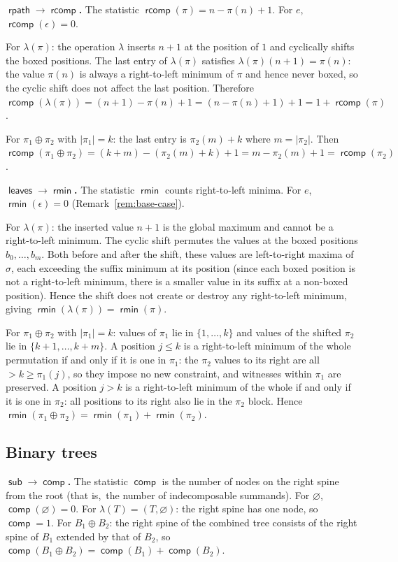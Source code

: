 \documentclass[a4paper,11pt]{article}
\theoremstyle{definition}
\DeclareMathOperator{\comp}{\mathsf{comp}}
\DeclareMathOperator{\rcomp}{\mathsf{rcomp}}
\DeclareMathOperator{\rpath}{\mathsf{rpath}}
\DeclareMathOperator{\leaves}{\mathsf{leaves}}
\DeclareMathOperator{\rmin}{\mathsf{rmin}}
\DeclareMathOperator{\subtrees}{\mathsf{sub}}
\begin{document}
\textbf{$\boldsymbol{\rpath \to \rcomp}$.}
The statistic $\rcomp(\pi) = n - \pi(n) + 1$. For $e$,
$\rcomp(\epsilon) = 0$.

For $\lambda(\pi)$: the operation $\lambda$ inserts
$n{+}1$ at the position of $1$ and cyclically shifts the
boxed positions. The last entry of $\lambda(\pi)$
satisfies $\lambda(\pi)(n{+}1) = \pi(n)$: the value
$\pi(n)$ is always a right-to-left minimum of $\pi$
and hence never boxed, so the cyclic shift does not
affect the last position. Therefore
$\rcomp(\lambda(\pi))
= (n{+}1) - \pi(n) + 1 = (n - \pi(n) + 1) + 1
= 1 + \rcomp(\pi)$.

For $\pi_1 \oplus \pi_2$ with $|\pi_1| = k$: the last
entry is $\pi_2(m) + k$ where $m = |\pi_2|$. Then
$\rcomp(\pi_1 \oplus \pi_2)
= (k{+}m) - (\pi_2(m) + k) + 1
= m - \pi_2(m) + 1 = \rcomp(\pi_2)$.

\textbf{$\boldsymbol{\leaves \to \rmin}$.}
The statistic $\rmin$ counts right-to-left minima. For
$e$, $\rmin(\epsilon) = 0$ (Remark~\ref{rem:base-case}).

For $\lambda(\pi)$: the inserted value $n{+}1$ is the
global maximum and cannot be a right-to-left minimum.
The cyclic shift permutes the values at the boxed
positions $b_0, \ldots, b_m$. Both before and after
the shift, these values are left-to-right maxima of
$\sigma$, each exceeding the suffix minimum at its
position (since each boxed position is not a
right-to-left minimum, there is a smaller value in
its suffix at a non-boxed position). Hence the shift does not create or destroy
any right-to-left minimum, giving
$\rmin(\lambda(\pi)) = \rmin(\pi)$.

For $\pi_1 \oplus \pi_2$ with $|\pi_1| = k$: values of
$\pi_1$ lie in $\{1, \ldots, k\}$ and values of the
shifted $\pi_2$ lie in $\{k{+}1, \ldots, k{+}m\}$. A
position $j \leq k$ is a right-to-left minimum of the
whole permutation if and only if it is one in $\pi_1$:
the $\pi_2$ values to its right are all
$> k \geq \pi_1(j)$, so they impose no new constraint,
and witnesses within $\pi_1$ are preserved. A position
$j > k$ is a right-to-left minimum of the whole if and
only if it
is one in $\pi_2$: all positions to its right also lie
in the $\pi_2$ block. Hence
$\rmin(\pi_1 \oplus \pi_2)
= \rmin(\pi_1) + \rmin(\pi_2)$.

\subsection{Binary trees}\label{sec:dict-binary}

\textbf{$\boldsymbol{\subtrees \to \comp}$.}
The statistic $\comp$ is the number of nodes on the
right spine from the root (that is,\ the number of
indecomposable summands). For $\varnothing$,
$\comp(\varnothing) = 0$. For
$\lambda(T) = (T, \varnothing)$: the right spine has
one node, so $\comp = 1$. For $B_1 \oplus B_2$: the
right spine of the combined tree consists of the right
spine of $B_1$ extended by that of $B_2$, so
$\comp(B_1 \oplus B_2)
= \comp(B_1) + \comp(B_2)$.
\end{document}
